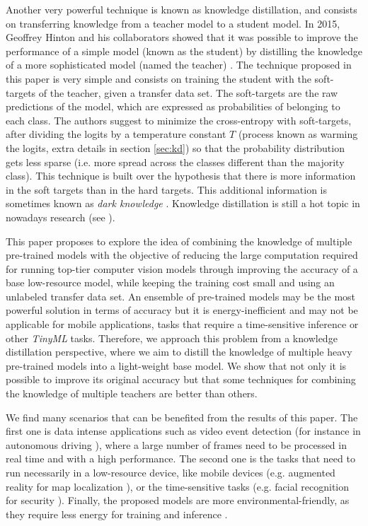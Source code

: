 Another very powerful technique is known as knowledge distillation, and consists on transferring knowledge from a teacher model to a student model. In 2015, Geoffrey Hinton and his collaborators showed that it was possible to improve the performance of a simple model (known as the student) by distilling the knowledge of a more sophisticated model (named the teacher) \cite{hinton2015}. The technique proposed in this paper is very simple and consists on training the student with the soft-targets of the teacher, given a transfer data set. The soft-targets are the raw predictions of the model, which are expressed as probabilities of belonging to each class. The authors suggest to minimize the cross-entropy with soft-targets, after dividing the logits by a temperature constant $T$ (process known as warming the logits, extra details in section \ref{sec:kd}) so that the probability distribution gets less sparse (i.e. more spread across the classes different than the majority class). This technique is built over the hypothesis that there is more information in the soft targets than in the hard targets. This additional information is sometimes known as \textit{dark knowledge} \cite{gou2020}. Knowledge distillation is still a hot topic in nowadays research (see \cite{tan2021, zhao2021, lee2021}).


This paper proposes to explore the idea of combining the knowledge of multiple pre-trained models with the objective of reducing the large computation required for running top-tier computer vision models through improving the accuracy of a base low-resource model, while keeping the training cost small and using an unlabeled transfer data set. 	An ensemble of pre-trained models may be the most powerful solution in terms of accuracy but it is energy-inefficient and may not be applicable for mobile applications, tasks that require a time-sensitive inference \cite{sanchez2020} or other \textit{TinyML} tasks. Therefore, we approach this problem from a knowledge distillation perspective, where we aim to distill the knowledge of multiple heavy pre-trained models into a light-weight base model. We show that not only it is possible to improve its original accuracy but that some techniques for combining the knowledge of multiple teachers are better than others. 

We find many scenarios that can be benefited from the results of this paper. The first one is data intense applications such as video event detection \cite{chakraborty2021} (for instance in autonomous driving \cite{swaminathan2019}), where a large number of frames need to be processed in real time and with a high performance. The second one is the tasks that need to run necessarily in a low-resource device, like mobile devices (e.g. augmented reality for map localization \cite{limmer2017}), or the time-sensitive tasks (e.g. facial recognition for security \cite{aung2021}). Finally, the proposed models are more environmental-friendly, as they require less energy for training and inference \cite{wu2022sustainable}.


